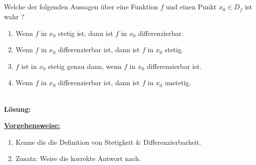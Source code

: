 \subsection*{}
Welche der folgenden Aussagen über eine Funktion $ f $ und einen Punkt $ x_0 \in D_f $ ist wahr ? 
\renewcommand{\labelenumi}{(\alph{enumi})}
\begin{enumerate}
	\item 
	Wenn $ f $ in $ x_0 $ stetig ist, dann ist $ f $ in $ x_0 $ differenzierbar.
	\item 
	Wenn $ f $ in $ x_0 $ differenzierbar ist, dann ist $ f $ in $ x_0 $ stetig.
	\item 
	$ f $ ist in $ x_0 $ stetig genau dann, wenn $ f $ in $ x_0 $ differenzierbar ist.
	\item
	Wenn $ f $ in $ x_0 $ differenzierbar ist, dann ist $ f $ in $ x_0 $ unstetig.
\end{enumerate}
\ \\
\textbf{Lösung:}
\begin{mdframed}
\underline{\textbf{Vorgehensweise:}}
\renewcommand{\labelenumi}{\theenumi.}
\begin{enumerate}
\item Kenne die die Definition von Stetigkeit \& Differenzierbarkeit.
\item Zusatz: Weise die korrekte Antwort nach.
\end{enumerate}
\end{mdframed}

